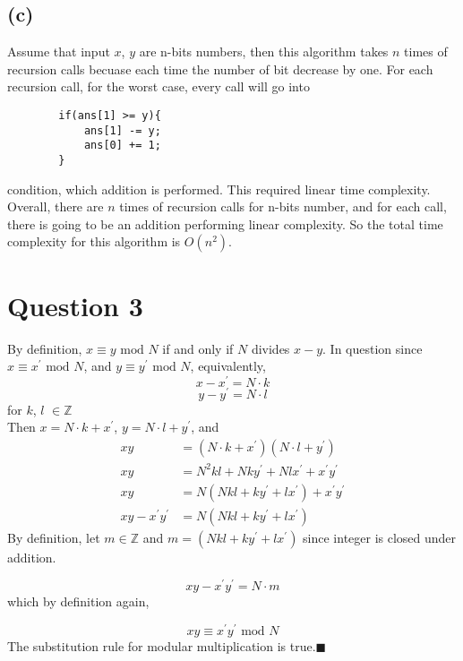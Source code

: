 \documentclass{article}
\begin{document}
    \subsection{(c)}
    Assume that input $x$, $y$ are n-bits numbers, then this algorithm takes $n$ times of recursion calls becuase each time the number of bit decrease by one.
    For each recursion call, for the worst case, every call will go into 
    \begin{verbatim}
        if(ans[1] >= y){
            ans[1] -= y;
            ans[0] += 1;
        }
    \end{verbatim}
    condition, which addition is performed. This required linear time complexity.
    \\
    Overall, there are $n$ times of recursion calls for n-bits number, and for each call, there is going to be an addition performing linear complexity.
    So the total time complexity for this algorithm is $O(n^2)$.

    
    

    

\section{Question 3}
By definition, $x \equiv y \mbox{ mod } N $ if and only if $N$ divides $x-y$.
In question since $x \equiv x^\prime \mbox{ mod } N$, and $y \equiv y^\prime \mbox{ mod } N $, equivalently,
$$x - x^\prime = N \cdot k$$
$$y - y^\prime = N \cdot l$$
for $k$, $l$ $\in \mathbb{Z}$
\\
Then $x = N \cdot k + x^\prime$, $y = N \cdot l + y^\prime$, and 
\begin{align}
    xy &= (N \cdot k + x^\prime) (N \cdot l + y^\prime) \nonumber \\
xy &= N^2 k l + Nk y^\prime + Nlx^\prime + x^\prime y^\prime \nonumber \\
xy &= N(Nkl + k y^\prime + lx^\prime) + x^\prime y^\prime \nonumber \\
xy - x^\prime y^\prime &= N(Nkl + k y^\prime + lx^\prime) \nonumber
\end{align}
By definition, let $m \in \mathbb{Z}$ and $m = (Nkl + k y^\prime + lx^\prime)$ since integer is closed under addition.

$$xy - x^\prime y^\prime = N \cdot m$$
which by definition again,

$$xy \equiv x^\prime y^\prime \mbox{ mod } N $$
The substitution rule for modular multiplication is true.$\blacksquare$


    
\end{document}
